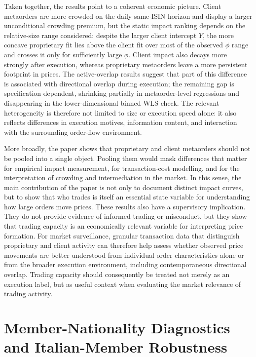 \documentclass[11pt]{article}
\begin{document}
Taken together, the results point to a coherent economic picture. Client metaorders are more crowded on the
daily same-ISIN horizon and display a larger unconditional crowding premium, but the static impact ranking depends on the
relative-size range considered: despite the larger client intercept $Y$, the more concave proprietary fit lies above the client
fit over most of the observed $\phi$ range and crosses it only for sufficiently large $\phi$. Client impact also decays more
strongly after execution, whereas proprietary metaorders leave a more persistent footprint in prices. The active-overlap results
suggest that part of this difference is associated with directional overlap during execution; the remaining gap is specification
dependent, shrinking partially in metaorder-level regressions and disappearing in the lower-dimensional binned WLS check. The relevant
heterogeneity is therefore not limited to size or execution speed alone: it also reflects differences in execution motives,
information content, and interaction with the surrounding order-flow environment.

More broadly, the paper shows that proprietary and client metaorders should not be pooled into a single object. Pooling them would
mask differences that matter for empirical impact measurement, for transaction-cost modelling, and for the interpretation of
crowding and intermediation in the market. In this sense, the main contribution of the paper is not only to document distinct
impact curves, but to show that who trades is itself an essential state variable for understanding how large orders move prices.
These results also have a supervisory implication. They do not provide 
evidence of informed trading or misconduct, but they show that trading capacity is an 
economically relevant variable for interpreting price formation. For market surveillance, 
granular transaction data that distinguish proprietary and client activity can therefore 
help assess whether observed price movements are better understood from individual order 
characteristics alone or from the broader execution environment, including contemporaneous 
directional overlap. Trading capacity should consequently be treated not merely as an 
execution label, but as useful context when evaluating the market relevance of trading 
activity.

\newpage 

\appendix

\section{Member-Nationality Diagnostics and Italian-Member Robustness}
\label{app:member_nationality_results}
\label{app:it_member_results}
\end{document}

